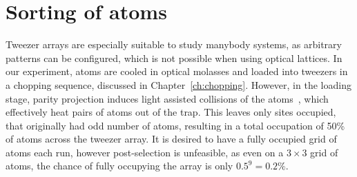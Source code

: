 \chapter{Sorting of atoms}%
\label{sec:sorting}



Tweezer arrays are especially suitable to study manybody systems, as arbitrary patterns can be configured, which is not possible when using optical lattices. In our experiment, atoms are cooled in optical molasses and loaded into tweezers in a chopping sequence, discussed in Chapter~\ref{ch:chopping}. However, in the loading stage, parity projection induces light assisted collisions of the atoms~\cite{Cooper2018}, which effectively heat pairs of atoms out of the trap. This leaves only sites occupied, that originally had odd number of atoms, resulting in a total occupation of 50\% of atoms across the tweezer array. It is desired to have a fully occupied grid of atoms each run, however post-selection is unfeasible, as even on a $3\times3$ grid of atoms, the chance of fully occupying the array is only $0.5^9 = 0.2\%$.

